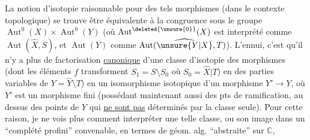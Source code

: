 La notion d'isotopie raisonnable pour des
tels morphismes (dans le contexte topologique)
se trouve être équivalente à la congruence
sous le groupe $\operatorname{Aut}^0(X)\times\operatorname{Aut}^0(Y)$
(où $\operatorname{Aut}^{\deleted{\unsure{0}}}(X)$ est interprété comme $\operatorname{Aut}(\widehat X,S)$,
et $\operatorname{Aut}(Y)$ comme $\operatorname{Aut}(\widehat{\unsure{Y|X}},T)$). L'ennui,
c'est qu'il n'y a plus de factorisation
\uline{canonique} d'une classe d'isotopie des
morphismes  (dont les éléments  $f$
transforment $S_1=S\setminus S_0$ où $S_0=\widehat X|T$) en
des parties variables de $Y=\widehat Y\setminus T$) en
un isomorphisme  isotopique  
 d'un morphisme $Y'\longrightarrow Y$, où $Y'$ est un
morphisme fini (possédant maintenant aussi
 des pts de ramification, au dessus des
points de $Y$ qui \uline{ne sont pas} déterminés
par la classe seule). Pour cette raison,
je ne vois plus comment interpréter une
telle classe, ou son image dans un
 ``complété profini'' convenable,
en termes de géom. alg. ``abstraite'' sur $\mathbb C$,
